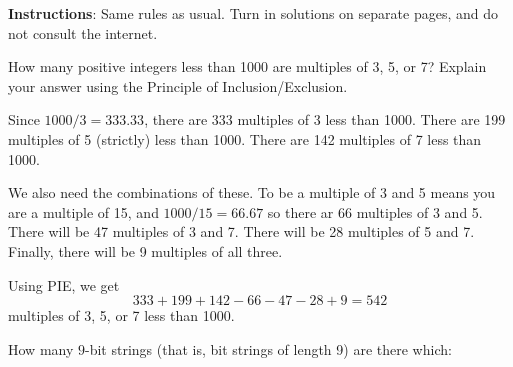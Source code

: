 \documentclass[10pt]{exam}
\begin{document}
\noindent \textbf{Instructions}: Same rules as usual.  Turn in solutions on separate pages, and do not consult the internet.

\begin{questions}


\question[4] How many positive integers less than 1000 are multiples of 3, 5, or 7?  Explain your answer using the Principle of Inclusion/Exclusion.

\begin{solution}
	Since $1000/3 = 333.33$, there are 333 multiples of 3 less than 1000.  There are 199 multiples of 5 (strictly) less than 1000.  There are 142 multiples of 7 less than 1000.

	We also need the combinations of these.  To be a multiple of 3 and 5 means you are a multiple of 15, and $1000/15 = 66.67$ so there ar 66 multiples of 3 and 5.  There will be 47 multiples of 3 and 7.  There will be 28 multiples of 5 and 7.  Finally, there will be 9 multiples of all three.

	Using PIE, we get
	\[333+199 + 142 - 66 - 47 - 28 + 9 = 542\]
	multiples of 3, 5, or 7 less than 1000.
\end{solution}

	\question[8] How many $9$-bit strings (that is, bit strings of length 9) are there which:
\end{questions}
\end{document}
